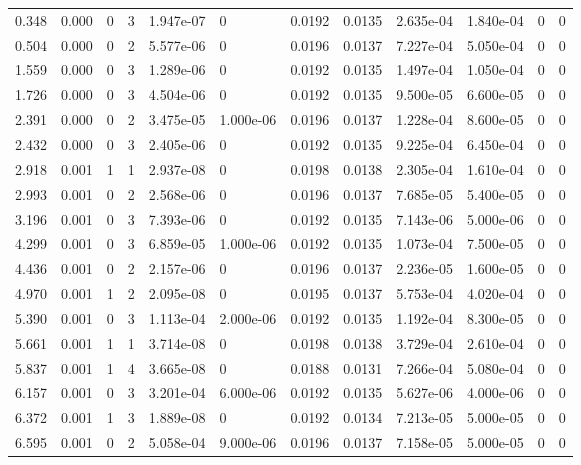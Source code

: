 \documentclass[preview]{standalone}
\begin{document}
{{\begin{tabular}{L{1.2cm}C{1.2cm} C{0.3cm}C{0.5cm} C{1.4cm}C{1.4cm} C{1.4cm}C{1.4cm} C{1.6cm}C{1.6cm} C{1.6cm}C{1.6cm}}
  0.348  &  0.000  & 0     &  3 &  1.947e-07  & 0  &  0.0192&   0.0135& 2.635e-04 & 1.840e-04   &  0 & 0  \\ 
  0.504  &  0.000  & 0     &  2 &  5.577e-06  & 0  &  0.0196&   0.0137& 7.227e-04 & 5.050e-04   &  0 & 0  \\ 
  1.559  &  0.000  & 0     &  3 &  1.289e-06  & 0  &  0.0192&   0.0135& 1.497e-04 & 1.050e-04   &  0 & 0  \\ 
  1.726  &  0.000  & 0     &  3 &  4.504e-06  & 0  &  0.0192&   0.0135& 9.500e-05 & 6.600e-05   &  0 & 0  \\ 
  2.391  &  0.000  & 0     &  2 &  3.475e-05  & 1.000e-06  &  0.0196&   0.0137& 1.228e-04 & 8.600e-05   &  0 & 0  \\ 
  2.432  &  0.000  & 0     &  3 &  2.405e-06  & 0  &  0.0192&   0.0135& 9.225e-04 & 6.450e-04   &  0 & 0  \\ 
  2.918  &  0.001  & 1     &  1 &  2.937e-08  & 0  &  0.0198&   0.0138& 2.305e-04 & 1.610e-04   &  0 & 0  \\ 
  2.993  &  0.001  & 0     &  2 &  2.568e-06  & 0  &  0.0196&   0.0137& 7.685e-05 & 5.400e-05   &  0 & 0  \\ 
  3.196  &  0.001  & 0     &  3 &  7.393e-06  & 0  &  0.0192&   0.0135& 7.143e-06 & 5.000e-06   &  0 & 0  \\ 
  4.299  &  0.001  & 0     &  3 &  6.859e-05  & 1.000e-06  &  0.0192&   0.0135& 1.073e-04 & 7.500e-05   &  0 & 0  \\ 
  4.436  &  0.001  & 0     &  2 &  2.157e-06  & 0  &  0.0196&   0.0137& 2.236e-05 & 1.600e-05   &  0 & 0  \\ 
  4.970  &  0.001  & 1     &  2 &  2.095e-08  & 0  &  0.0195&   0.0137& 5.753e-04 & 4.020e-04   &  0 & 0  \\ 
  5.390  &  0.001  & 0     &  3 &  1.113e-04  & 2.000e-06  &  0.0192&   0.0135& 1.192e-04 & 8.300e-05   &  0 & 0  \\ 
  5.661  &  0.001  & 1     &  1 &  3.714e-08  & 0  &  0.0198&   0.0138& 3.729e-04 & 2.610e-04   &  0 & 0  \\ 
  5.837  &  0.001  & 1     &  4 &  3.665e-08  & 0  &  0.0188&   0.0131& 7.266e-04 & 5.080e-04   &  0 & 0  \\ 
  6.157  &  0.001  & 0     &  3 &  3.201e-04  & 6.000e-06  &  0.0192&   0.0135& 5.627e-06 & 4.000e-06   &  0 & 0  \\ 
  6.372  &  0.001  & 1     &  3 &  1.889e-08  & 0  &  0.0192&   0.0134& 7.213e-05 & 5.000e-05   &  0 & 0  \\ 
  6.595  &  0.001  & 0     &  2 &  5.058e-04  & 9.000e-06  &  0.0196&   0.0137& 7.158e-05 & 5.000e-05   &  0 & 0  \\ 

\end{tabular}}}
\end{document}
